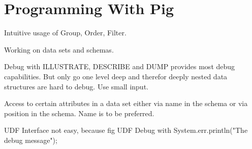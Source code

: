 \section{Programming With Pig}

Intuitive usage of Group, Order, Filter.

Working on data sets and schemas.

Debug with ILLUSTRATE, DESCRIBE and DUMP provides most debug capabilities. But only go one level deep and therefor deeply nested data structures are hard to debug. Use small input. 



Access to certain attributes in a data set either via name in the schema or via position in the schema. Name is to be preferred.




UDF Interface not easy, because fig 
UDF Debug with System.err.println("The debug message");